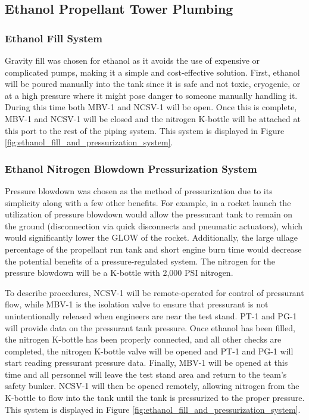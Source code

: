 \documentclass[9pt]{article} %
\numberwithin{equation}{section} %
\begin{document}
\subsection{Ethanol Propellant Tower Plumbing}

\subsubsection{Ethanol Fill System}
\hspace{\parindent} Gravity fill was chosen for ethanol as it avoids the use of expensive or complicated pumps, making it a simple and cost-effective solution. First, ethanol will be poured manually into the tank since it is safe and not toxic, cryogenic, or at a high pressure where it might pose danger to someone manually handling it. During this time both MBV-1 and NCSV-1 will be open. Once this is complete, MBV-1 and NCSV-1 will be closed and the nitrogen K-bottle will be attached at this port to the rest of the piping system. This system is displayed in Figure \ref{fig:ethanol_fill_and_pressurization_system}.

\subsubsection{Ethanol Nitrogen Blowdown Pressurization System}
\hspace{\parindent} Pressure blowdown was chosen as the method of pressurization due to its simplicity along with a few other benefits. For example, in a rocket launch the utilization of pressure blowdown would allow the pressurant tank to remain on the ground (disconnection via quick disconnects and pneumatic actuators), which would significantly lower the GLOW of the rocket. Additionally, the large ullage percentage of the propellant run tank and short engine burn time would decrease the potential benefits of a pressure-regulated system. The nitrogen for the pressure blowdown will be a K-bottle with 2,000 PSI nitrogen.

To describe procedures, NCSV-1 will be remote-operated for control of pressurant flow, while MBV-1 is the isolation valve to ensure that pressurant is not unintentionally released when engineers are near the test stand. PT-1 and PG-1 will provide data on the pressurant tank pressure. Once ethanol has been filled, the nitrogen K-bottle has been properly connected, and all other checks are completed, the nitrogen K-bottle valve will be opened and PT-1 and PG-1 will start reading pressurant pressure data. Finally, MBV-1 will be opened at this time and all personnel will leave the test stand area and return to the team's safety bunker. NCSV-1 will then be opened remotely, allowing nitrogen from the K-bottle to flow into the tank until the tank is pressurized to the proper pressure. This system is displayed in Figure \ref{fig:ethanol_fill_and_pressurization_system}.
\end{document}

